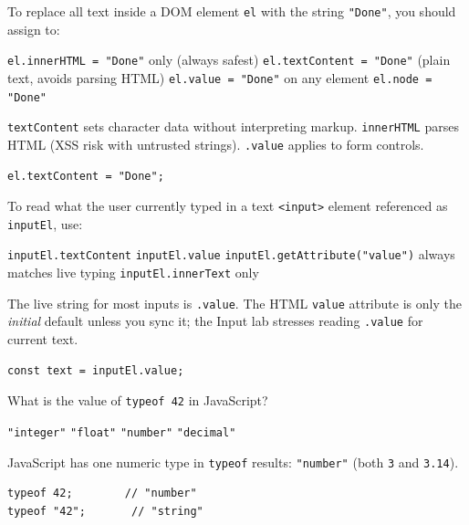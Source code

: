 \question[4]
To replace all text inside a DOM element \texttt{el} with the string \texttt{"Done"}, you should assign to:
\begin{choices}
  \choice \texttt{el.innerHTML = "Done"} only (always safest)
  \CorrectChoice \texttt{el.textContent = "Done"} (plain text, avoids parsing HTML)
  \choice \texttt{el.value = "Done"} on any element
  \choice \texttt{el.node = "Done"}
\end{choices}
\begin{solution}
  \texttt{textContent} sets character data without interpreting markup. \texttt{innerHTML} parses HTML (XSS risk with untrusted strings). \texttt{.value} applies to form controls.
\begin{lstlisting}[style=jsexam]
el.textContent = "Done";
\end{lstlisting}
\end{solution}

\question[4]
To read what the user currently typed in a text \texttt{<input>} element referenced as \texttt{inputEl}, use:
\begin{choices}
  \choice \texttt{inputEl.textContent}
  \CorrectChoice \texttt{inputEl.value}
  \choice \texttt{inputEl.getAttribute("value")} always matches live typing
  \choice \texttt{inputEl.innerText} only
\end{choices}
\begin{solution}
  The live string for most inputs is \texttt{.value}. The HTML \texttt{value} attribute is only the \emph{initial} default unless you sync it; the Input lab stresses reading \texttt{.value} for current text.
\begin{lstlisting}[style=jsexam]
const text = inputEl.value;
\end{lstlisting}
\end{solution}

\question[4]
What is the value of \texttt{typeof 42} in JavaScript?
\begin{choices}
  \choice \texttt{"integer"}
  \choice \texttt{"float"}
  \CorrectChoice \texttt{"number"}
  \choice \texttt{"decimal"}
\end{choices}
\begin{solution}
  JavaScript has one numeric type in \texttt{typeof} results: \texttt{"number"} (both \texttt{3} and \texttt{3.14}).
\begin{lstlisting}[style=jsexam]
typeof 42;        // "number"
typeof "42";       // "string"
\end{lstlisting}
\end{solution}

